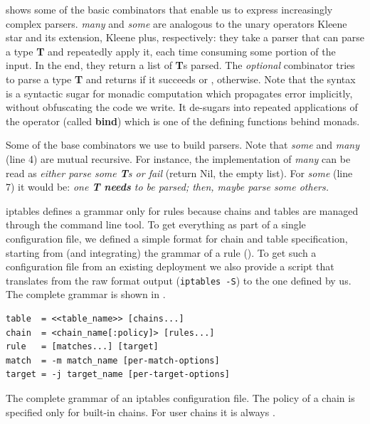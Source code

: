  shows some of the basic combinators
that enable us to express increasingly complex parsers.  \emph{many} and
\emph{some} are analogous to the unary operators Kleene star and its extension,
Kleene plus, respectively: they take a parser that can parse a type \textbf{T}
and repeatedly apply it, each time consuming some portion of the input.  In the
end, they return a list of \textbf{T}s parsed.  The \emph{optional} combinator
tries to parse a type \textbf{T} and returns  if it succeeds or
, otherwise.  Note that the  syntax is a
syntactic sugar for monadic computation which propagates error implicitly,
without obfuscating the code we write.  It de-sugars into repeated applications
of the \hlmath{$>>=$} operator (called \textbf{bind}) which is one of the
defining functions behind monads.

\begin{listing}[H]
  \caption[Some of the base combinators we use to build parsers.]{Some of the
  base combinators we use to build parsers.  Note that \emph{some} and
  \emph{many} (line 4) are mutual recursive.  For instance, the implementation
  of \emph{many} can be read as \emph{either parse some \textbf{T}s or fail}
  (return Nil, the empty list).  For \emph{some} (line 7) it would be:
  \emph{one \textbf{T needs} to be parsed; then, maybe parse some others.}}
  \label{lst:combinators}
\end{listing}

iptables defines a grammar only for rules because chains and tables are managed
through the command line tool.  To get everything as part of a single
configuration file, we defined a simple format for chain and table
specification, starting from (and integrating) the grammar of a rule
().  To get such a configuration file
from an existing deployment we also provide a script that translates from the
raw format output (\texttt{iptables -S}) to the one defined by us.  The
complete grammar is shown in .

\begin{listing}
  \small
  \lstset{numbers=none, frame=single, basicstyle=\ttfamily,
    xleftmargin=0.15\textwidth, xrightmargin=0.15\textwidth
  }
  \begin{lstlisting}
table  = <<table_name>> [chains...]
chain  = <chain_name[:policy]> [rules...]
rule   = [matches...] [target]
match  = -m match_name [per-match-options]
target = -j target_name [per-target-options]
  \end{lstlisting}
  \caption{The complete grammar of an iptables configuration file.  The policy
  of a chain is specified only for built-in chains.  For user chains it is
  always \RETURN.}
  \label{lst:our-grammar}
\end{listing}

